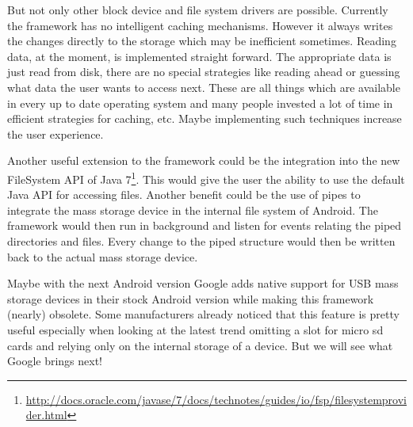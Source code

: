 But not only other block device and file system drivers are possible. Currently the framework has no intelligent caching mechanisms. However it always writes the changes directly to the storage which may be inefficient sometimes. Reading data, at the moment, is implemented straight forward. The appropriate data is just read from disk, there are no special strategies like reading ahead or guessing what data the user wants to access next. These are all things which are available in every up to date operating system and many people invested a lot of time in efficient strategies for caching, etc. Maybe implementing such techniques increase the user experience.

Another useful extension to the framework could be the integration into the new FileSystem API of Java 7\footnote{\url{http://docs.oracle.com/javase/7/docs/technotes/guides/io/fsp/filesystemprovider.html}}. This would give the user the ability to use the default Java API for accessing files. Another benefit could be the use of pipes to integrate the mass storage device in the internal file system of Android. The framework would then run in background and listen for events relating the piped directories and files. Every change to the piped structure would then be written back to the actual mass storage device.

Maybe with the next Android version Google adds native support for USB mass storage devices in their stock Android version while making this framework (nearly) obsolete. Some manufacturers already noticed that this feature is pretty useful especially when looking at the latest trend omitting a slot for micro sd cards and relying only on the internal storage of a device. But we will see what Google brings next!